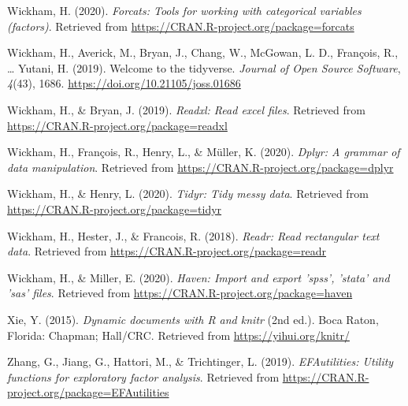 \documentclass[
  english,
  man]{apa6}
\begin{document}
\leavevmode\hypertarget{ref-R-forcats}{}%
Wickham, H. (2020). \emph{Forcats: Tools for working with categorical variables (factors)}. Retrieved from \url{https://CRAN.R-project.org/package=forcats}

\leavevmode\hypertarget{ref-R-tidyverse}{}%
Wickham, H., Averick, M., Bryan, J., Chang, W., McGowan, L. D., François, R., \ldots{} Yutani, H. (2019). Welcome to the tidyverse. \emph{Journal of Open Source Software}, \emph{4}(43), 1686. \url{https://doi.org/10.21105/joss.01686}

\leavevmode\hypertarget{ref-R-readxl}{}%
Wickham, H., \& Bryan, J. (2019). \emph{Readxl: Read excel files}. Retrieved from \url{https://CRAN.R-project.org/package=readxl}

\leavevmode\hypertarget{ref-R-dplyr}{}%
Wickham, H., François, R., Henry, L., \& Müller, K. (2020). \emph{Dplyr: A grammar of data manipulation}. Retrieved from \url{https://CRAN.R-project.org/package=dplyr}

\leavevmode\hypertarget{ref-R-tidyr}{}%
Wickham, H., \& Henry, L. (2020). \emph{Tidyr: Tidy messy data}. Retrieved from \url{https://CRAN.R-project.org/package=tidyr}

\leavevmode\hypertarget{ref-R-readr}{}%
Wickham, H., Hester, J., \& Francois, R. (2018). \emph{Readr: Read rectangular text data}. Retrieved from \url{https://CRAN.R-project.org/package=readr}

\leavevmode\hypertarget{ref-R-haven}{}%
Wickham, H., \& Miller, E. (2020). \emph{Haven: Import and export 'spss', 'stata' and 'sas' files}. Retrieved from \url{https://CRAN.R-project.org/package=haven}

\leavevmode\hypertarget{ref-R-knitr}{}%
Xie, Y. (2015). \emph{Dynamic documents with R and knitr} (2nd ed.). Boca Raton, Florida: Chapman; Hall/CRC. Retrieved from \url{https://yihui.org/knitr/}

\leavevmode\hypertarget{ref-R-EFAutilities}{}%
Zhang, G., Jiang, G., Hattori, M., \& Trichtinger, L. (2019). \emph{EFAutilities: Utility functions for exploratory factor analysis}. Retrieved from \url{https://CRAN.R-project.org/package=EFAutilities}

\endgroup
\end{document}
